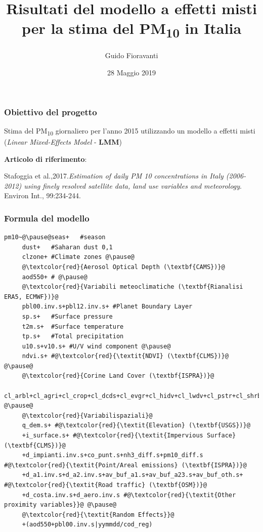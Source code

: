 \documentclass{beamer}
\title{Risultati del modello a effetti misti per la stima del PM\textsubscript{10} in Italia}
\author{Guido Fioravanti}
\date{28 Maggio 2019}
\institute{Istituto Superiore Per la Protezione e la Ricerca Ambientale}
\begin{document}

\maketitle

\begin{frame}

\frametitle{Obiettivo del progetto}
{\large Stima del PM\textsubscript{10} giornaliero per l'anno 2015 utilizzando un modello a effetti misti (\textit{Linear Mixed-Effects Model} - \textbf{LMM})\par}
\vspace{\baselineskip} %
\textbf{Articolo di riferimento}:\\
{\scriptsize Stafoggia et al.,2017.\textit{Estimation of daily PM 10 concentrations in Italy (2006-2012) using finely resolved satellite
data, land use variables and meteorology}.\\ Environ Int., 99:234-244.\par}

\end{frame}


\begin{frame}[fragile]
\frametitle{Formula del modello}

\begin{lstlisting}
pm10~@\pause@seas+   #season
     dust+   #Saharan dust 0,1
     clzone+ #Climate zones @\pause@
     @\textcolor{red}{Aerosol Optical Depth (\textbf{CAMS})}@	
     aod550+ # @\pause@
     @\textcolor{red}{Variabili meteoclimatiche (\textbf{Rianalisi ERA5, ECMWF})}@	
     pbl00.inv.s+pbl12.inv.s+ #Planet Boundary Layer
     sp.s+   #Surface pressure
     t2m.s+  #Surface temperature
     tp.s+   #Total precipitation
     u10.s+v10.s+ #U/V wind component @\pause@
     ndvi.s+ #@\textcolor{red}{\textit{NDVI} (\textbf{CLMS})}@ @\pause@
     @\textcolor{red}{Corine Land Cover (\textbf{ISPRA})}@
     cl_arbl+cl_agri+cl_crop+cl_dcds+cl_evgr+cl_hidv+cl_lwdv+cl_pstr+cl_shrb+ 	@\pause@
     @\textcolor{red}{Variabilispaziali}@
     q_dem.s+ #@\textcolor{red}{\textit{Elevation} (\textbf{USGS})}@
     +i_surface.s+ #@\textcolor{red}{\textit{Impervious Surface} (\textbf{CLMS})}@
     +d_impianti.inv.s+co_punt.s+nh3_diff.s+pm10_diff.s #@\textcolor{red}{\textit{Point/Areal emissions} (\textbf{ISPRA})}@
     +d_a1.inv.s+d_a2.inv.s+av_buf_a1.s+av_buf_a23.s+av_buf_oth.s+ #@\textcolor{red}{\textit{Road traffic} (\textbf{OSM})}@
     +d_costa.inv.s+d_aero.inv.s #@\textcolor{red}{\textit{Other proximity variables}}@ @\pause@
     @\textcolor{red}{\textit{Random Effects}}@ 
     +(aod550+pbl00.inv.s|yymmdd/cod_reg)
     	

\end{lstlisting}

\end{frame}
\end{document}
